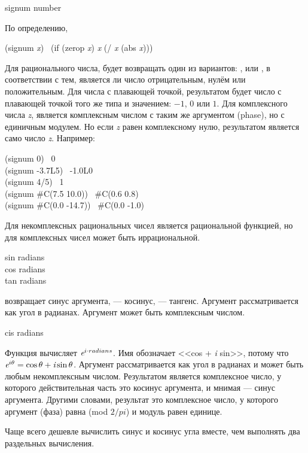 \begin{defun}[Функция]
signum number

По определению,
\begin{lisp}
(signum \emph{x}) \EQ\ (if (zerop \emph{x}) \emph{x} (/ \emph{x} (abs \emph{x})))
\end{lisp}
Для рационального числа,  будет возвращать один из вариантов:
,  или , в соответствии с тем, является ли число
отрицательным, нулём или положительным.
Для числа с плавающей точкой, результатом будет число с плавающей точкой того же
типа и значением: $-1$, $0$ или $1$.
Для комплексного числа \emph{z},  является комплексным
числом с таким же аргументом (phase), но с единичным модулем. Но если \emph{z}
равен комплексному нулю, результатом является само число \emph{z}.
Например:
\begin{lisp}
(signum 0) \EV\ 0 \\
(signum -3.7L5) \EV\ -1.0L0 \\
(signum 4/5) \EV\ 1 \\
(signum \#C(7.5 10.0)) \EV\ \#C(0.6 0.8) \\
(signum \#C(0.0 -14.7)) \EV\ \#C(0.0 -1.0)
\end{lisp}
Для некомплексных рациональных чисел  является рациональной
функцией, но для комплексных чисел может быть иррациональной.
\end{defun}

\begin{defun}[Функция]
sin radians \\
cos radians \\
tan radians

 возвращает синус аргумента,  --- косинус,  ---
тангенс. Аргумент рассматривается как угол в радианах. Аргумент может быть
комплексным числом.
\end{defun}

\begin{defun}[Функция]
cis radians

Функция вычисляет $ \emph{e} ^ {i \cdot radians} $.
Имя  обозначает <<cos + \emph{i} sin>>, потому что 
$ \emph{e} ^{ i \theta } = \cos \theta + \emph{i} \sin \theta $.
Аргумент рассматривается как угол в радианах и может быть любым некомплексным
числом. Результатом является комплексное число, у которого действительная часть
это косинус аргумента, и мнимая --- синус аргумента. Другими словами, результат
это комплексное число, у которого аргумент (фаза) равна (mod $2/pi$) и модуль
равен единице.

\beforenoterule
\begin{implementation}
Чаще всего дешевле вычислить синус и косинус угла вместе, чем выполнять два
раздельных вычисления.
\end{implementation}
\afternoterule
\end{defun}


